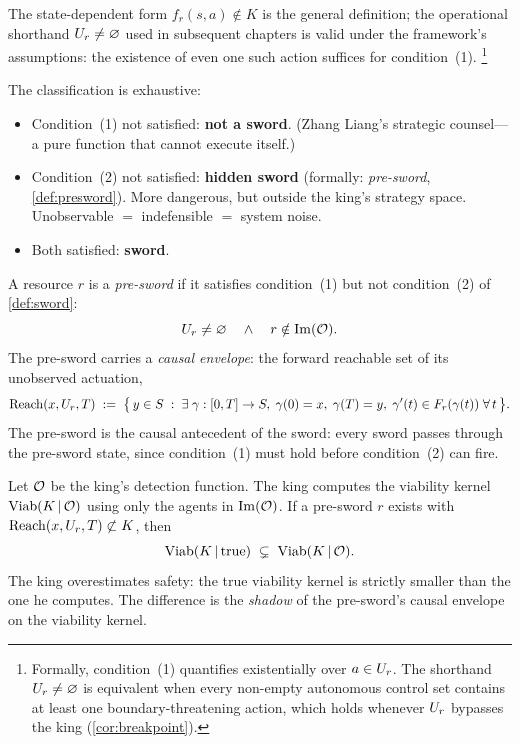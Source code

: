 The state-dependent form $f_r(s, a) \notin K$ is the general
definition; the operational shorthand $U_r \neq \varnothing$
used in subsequent chapters is valid under the framework's
assumptions: the existence of even one such action suffices
for condition~(1).%
\footnote{Formally, condition~(1) quantifies existentially over
$a \in U_r$.  The shorthand $U_r \neq \varnothing$ is equivalent
when every non-empty autonomous control set contains at least one
boundary-threatening action, which holds whenever $U_r$ bypasses
the king (\cref{cor:breakpoint}).}

The classification is exhaustive:
\begin{itemize}
  \item Condition~(1) not satisfied: \textbf{not a sword}. (Zhang
  Liang's strategic counsel---a pure function that cannot execute
  itself.)
  \item Condition~(2) not satisfied: \textbf{hidden sword}
  (formally: \emph{pre-sword}, \cref{def:presword}). More
  dangerous, but outside the king's strategy space. Unobservable
  $=$ indefensible $=$ system noise.
  \item Both satisfied: \textbf{sword}.
\end{itemize}

\begin{definition}\label{def:presword}
A resource $r$ is a \emph{pre-sword} if it satisfies condition~(1)
but not condition~(2) of \cref{def:sword}:
\[
  U_r \neq \varnothing
  \quad\wedge\quad
  r \notin \mathrm{Im}(\mathcal{O}).
\]
The pre-sword carries a \emph{causal envelope}: the forward
reachable set of its unobserved actuation,
\begin{equation}\label{eq:causal-envelope}
  \mathrm{Reach}(x, U_r, T)
  \;:=\;
  \bigl\{\, y \in S
    \;:\; \exists\;\gamma:[0,T] \to S,\;
    \gamma(0) = x,\;\gamma(T) = y,\;
    \gamma'(t) \in F_r(\gamma(t)) \;\forall\,t
  \,\bigr\}.
\end{equation}
The pre-sword is the causal antecedent of the sword: every sword
passes through the pre-sword state, since condition~(1) must hold
before condition~(2) can fire.
\end{definition}

\begin{proposition}\label{prop:viab-gap}
Let $\mathcal{O}$ be the king's detection function.  The king
computes the viability kernel $\mathrm{Viab}(K \,|\, \mathcal{O})$ using
only the agents in $\mathrm{Im}(\mathcal{O})$.  If a pre-sword $r$
exists with $\mathrm{Reach}(x, U_r, T) \not\subset K$, then
\[
  \mathrm{Viab}(K \,|\, \text{true})
  \;\subsetneq\;
  \mathrm{Viab}(K \,|\, \mathcal{O}).
\]
The king overestimates safety: the true viability kernel is strictly
smaller than the one he computes.  The difference is the
\emph{shadow} of the pre-sword's causal envelope on the viability
kernel.
\end{proposition}

